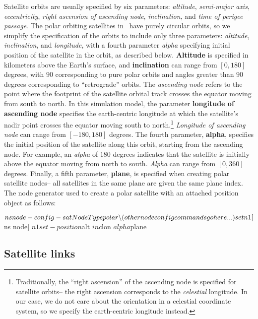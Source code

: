\begin{itemize}
Satellite orbits are usually specified by six parameters:  {\em altitude},
{\em semi-major axis}, {\em eccentricity}, 
{\em right ascension of ascending node}, {\em inclination}, and
{\em time of perigee passage}.  The polar orbiting satellites in \ns~have
purely circular orbits, so we simplify the specification of the orbits to
include only three parameters: {\em altitude}, {\em inclination}, and
{\em longitude}, with a fourth parameter {\em alpha} specifying initial 
position of the satellite in the orbit, as described below.
{\bf Altitude} is specified in kilometers above the Earth's surface, and 
{\bf inclination} can range from $[0,180]$ degrees, with $90$ corresponding
to pure polar orbits and angles greater than $90$ degrees corresponding
to ``retrograde'' orbits.  The {\em ascending node} refers to the point
where the footprint of the satellite orbital track crosses the equator 
moving from south to north.  In this simulation model, the parameter 
{\bf longitude of ascending node} specifies the earth-centric longitude at 
which the satellite's nadir point crosses the equator moving south
to north.\footnote{Traditionally, the ``right ascension'' of the ascending
node is specified for satellite orbits-- the right ascension corresponds to the 
{\em celestial} longitude.  In our case, we do not care about the
orientation in a celestial coordinate system, so we specify the earth-centric
longitude instead.} {\em Longitude of ascending node} can range from 
$[-180,180]$ degrees.  The fourth parameter,
{\bf alpha}, specifies the initial position of the satellite along this
orbit, starting from the ascending node.  
For example, an {\em alpha} of $180$ degrees indicates that the
satellite is initially above the equator moving from north to south.
{\em Alpha} can range from $[0,360]$ degrees.
Finally, a fifth parameter, {\bf plane}, is specified when creating
polar satellite nodes-- all satellites in the same plane are given the
same plane index.
The node generator 
used to create a polar satellite with an attached position object as 
follows:
\begin{program}
$ns node-config -satNodeType polar \bs
		(other node config commands go here...)
set n1 [$ns node]
$n1 set-position $alt $inc $lon $alpha $plane
\end{program}

\end{itemize}


\subsection{Satellite links}
\label{sec:satellite/usage/links}

